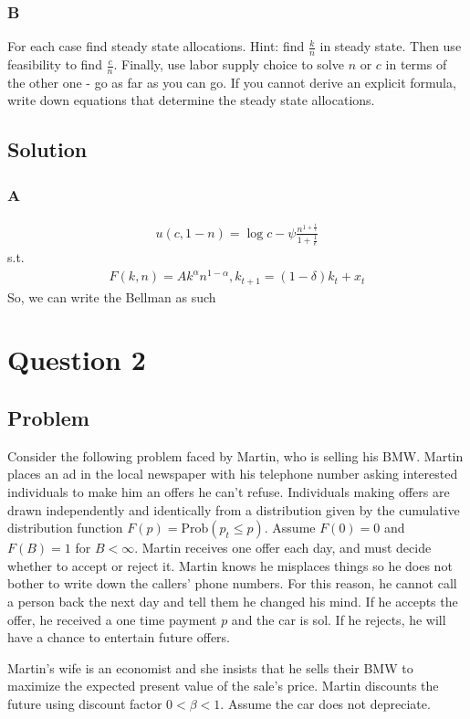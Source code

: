 \documentclass[10pt, a4paper]{article}
\newcommand{\pa}{u(c, 1-n) = \log c - \psi\frac{n^{1+\frac{1}{\epsilon}}}{1+\frac{1}{\epsilon}}}
\newcommand{\constr}{F(k,n) = Ak^{\alpha}n^{1-\alpha}, k_{t+1}=(1-\delta)k_t + x_t}
\begin{document}
    \subsubsection*{B} For each case find steady state allocations. Hint: find $\frac{k}{n}$ in steady state. Then use feasibility to find $\frac{c}{n}$. Finally, use labor supply choice to solve $n$ or $c$ in terms of the other one - go as far as you can go. If you cannot derive an explicit formula, write down equations that determine the steady state allocations. 
    \subsection*{Solution}
    \subsubsection*{A}
    \begin{align*}
      \pa 
    \end{align*}
    s.t.
    \begin{align*}
      \constr
    \end{align*}
    So, we can write the Bellman as such
    
  \section*{Question 2}
    \subsection*{Problem}
    Consider the following problem faced by Martin, who is selling his BMW. Martin places an ad in the local newspaper with his telephone number asking interested individuals to make him an offers he can’t refuse. Individuals making offers are drawn independently and identically from a distribution given by the cumulative distribution function $F(p) = \text{Prob}(p_t\leq p)$. Assume $F(0) = 0$ and $F(B)=1$ for $B<\infty$. Martin receives one offer each day, and must decide whether to accept or reject it. Martin knows he misplaces things so he does not bother to write down the callers’ phone numbers. For this reason, he cannot call a person back the next day and tell them he changed his mind. If he accepts the offer, he received a one time payment $p$ and the car is sol. If he rejects, he will have a chance to entertain future offers.

      Martin’s wife is an economist and she insists that he sells their BMW to maximize the expected present value of the sale’s price. Martin discounts the future using discount factor $0<\beta<1$. Assume the car does not depreciate.
\end{document}
